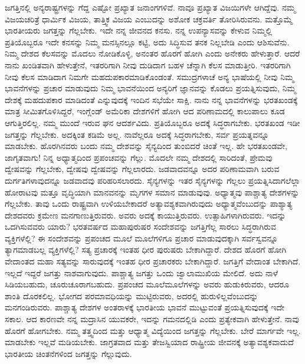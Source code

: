 \vskip   4pt

ಜಗತ್ತಿನಲ್ಲಿ ಅನ್ಯರಾಷ್ಟ್ರಗಳನ್ನು ಗೆದ್ದ ಎಷ್ಟೋ ಪ್ರಖ್ಯಾತ ಜನಾಂಗಗಳಿವೆ. ನಾವೂ ಪ್ರಖ್ಯಾತ ವಿಜಯಿಗಳೇ ಆಗಿದ್ದೆವು. ನಮ್ಮ ವಿಜಯಚರಿತ್ರೆ ಧಾರ್ಮಿಕ ವಿಜಯ, ತಾತ್ತ್ವಿಕ ವಿಜಯ ಎಂಬುದನ್ನು ಅಶೋಕ ಚಕ್ರವರ್ತಿ ತೋರಿಸಿರುವನು. ಮತ್ತೊಮ್ಮೆ ಭಾರತೀಯರು ಜಗತ್ತನ್ನು ಗೆಲ್ಲಬೇಕು. ಇದೇ ನನ್ನ ಜೀವನದ ಕನಸು. ನನ್ನ ಉಪನ್ಯಾಸವನ್ನು ಕೇಳುವ ನಿಮ್ಮಲ್ಲಿ ಪ್ರತಿಯೊಬ್ಬರೂ ಇದೇ ಕನಸನ್ನು ನಿಮ್ಮ ಮನಸ್ಸಿನಲ್ಲೂ ಕಟ್ಟಿ, ಅದು ಸಿದ್ಧಿಸುವ ತನಕ ನಿಲ್ಲಬೇಡಿ ಎಂದು ಆಶಿಸುವೆನು. ನಿಮ್ಮ ದೇಶದ ಕೆಲಸವನ್ನು ಮೊದಲು ನೋಡಿಕೊಳ್ಳಿ, ಅನಂತರ ಹೊರಗೆ ಹೋಗಿ ಎಂದು ಅನೇಕರು ಹೇಳುತ್ತಾರೆ. ಆದರೆ ನಾನು ಖಂಡಿತವಾಗಿ ಹೇಳುತ್ತೇನೆ, ಇತರರಿಗಾಗಿ ನೀವು ದುಡಿದಾಗ ಬಹಳ ಚೆನ್ನಾಗಿ ಕೆಲಸ ಮಾಡುತ್ತೀರಿ. ಇತರರಿಗಾಗಿ ನೀವು ಕೆಲಸ ಮಾಡಿದಾಗ ನಿಮಗೇ ಮಹದುಪಕಾರಮಾಡಿಕೊಂಡಂತೆ. ಸಮುದ್ರಗಳಾಚೆ ಅನ್ಯ ಭಾಷೆಯಲ್ಲಿ ನೀವು ನಿಮ್ಮ ಭಾವನೆಗಳನ್ನು ಪ್ರಚಾರ ಮಾಡುವುದು ನಿಮ್ಮ ಭಾವನೆಯಿಂದ ಅನ್ಯರಿಗೆ ಜ್ಞಾನವನ್ನು ಕೊಡಲು ಪ್ರಯತ್ನಿಸುವುದು, ನಿಮ್ಮ ದೇಶಕ್ಕೆ ಮಹದುಪಕಾರ ಮಾಡಿದಂತೆ ಎನ್ನುವುದಕ್ಕೆ ಇಂದಿನ ಸಭೆಯೇ ಸಾಕ್ಷಿ. ನಾನು ನನ್ನ ಭಾವನೆಗಳನ್ನು ಭರತಖಂಡಕ್ಕೆ ಮಾತ್ರ ಸೀಮಿತಗೊಳಿಸಿದ್ದರೆ, ಇಂಗ್ಲೆಂಡ್​ ಅಮೆರಿಕಾ ದೇಶಗಳಿಗೆ ಹೋಗಿ ಆದ ಪರಿಣಾಮದಲ್ಲಿ ಕಾಲುಪಾಲು ಕೂಡ ಆಗುತ್ತಿರಲಿಲ್ಲ. ನಮ್ಮ ಮುಂದೆ ಇರುವ ಘನ ಆದರ್ಶವಿದು. ಪ್ರತಿಯೊಬ್ಬರೂ ಅದಕ್ಕೆ ಸಿದ್ಧರಾಗಬೇಕು. ಭರತಖಂಡ ಇಡೀ ಜಗತ್ತನ್ನು ಗೆಲ್ಲಬೇಕು. ಅದಕ್ಕಿಂತ ಕಡಿಮೆ ಅಲ್ಲ. ನಾವೆಲ್ಲರೂ ಅದಕ್ಕೆ ಸಿದ್ಧರಾಗಬೇಕು, ಸರ್ವ ಪ್ರಯತ್ನವನ್ನೂ ಮಾಡಬೇಕು. ಹೊರಗಿನವರು ಬಂದು ನಮ್ಮ ದೇಶವನ್ನು ಸೈನ್ಯದಿಂದ ತುಂಬಿದರೆ\- ಚಿಂತೆ ಇಲ್ಲ. ಹೇ ಭರತಖಂಡವೇ, ಜಾಗೃತವಾಗು! ನಿನ್ನ ಅಧ್ಯಾತ್ಮದಿಂದ ಪ್ರಪಂಚವನ್ನು ಗೆಲ್ಲು. ಮೊದಲೇ ನಮ್ಮ ದೇಶದಲ್ಲಿ ಸಾರಿದಂತೆ, ಪ್ರೇಮವು ದ್ವೇಷವನ್ನು ಗೆಲ್ಲಬೇಕು, ದ್ವೇಷವು ದ್ವೇಷವನ್ನು ಗೆಲ್ಲಲಾರದು. ಜಡವಾದವನ್ನೂ ಅದರ ಪರಿಣಾಮವಾಗಿ ಬರುವ ದುರ್ಗತಿಗಳಾವುದನ್ನೂ ಜಡವಾದವು ಪರಿಹರಿಸಲಾರದು. ಸೈನ್ಯಗಳನ್ನು ಇತರ ಸೈನ್ಯಗಳನ್ನು ಗೆಲ್ಲಲು ಪ್ರಯತ್ನಿಸಿದಾಗಲೆಲ್ಲಾ ಹೋರಾಟವು ಮತ್ತೂ ವೃದ್ಧಿಯಾಗಿ ಮಾನವನನ್ನು ಮೃಗಗಳ ಸಮಾನ ಮಾಡುವುವು. ಅಧ್ಯಾತ್ಮವು ಪಾಶ್ಚಾತ್ಯ ದೇಶಗಳನ್ನು ಗೆಲ್ಲಬೇಕು. ತಾವು ಒಂದು ರಾಷ್ಟ್ರವಾಗಿ ಉಳಿಯಬೇಕಾದರೆ ಅತ್ಯಾವಶ್ಯಕವಾಗಿರುವುದು ಅಧ್ಯಾತ್ಮವೆಂಬುದನ್ನು ಪಾಶ್ಯಾತ್ಯ ದೇಶದವರು ಕ್ರಮೇಣ ಮನಗಾಣುತ್ತಿರುವರು. ಅವರು ಅದಕ್ಕೆ ಕಾಯುತ್ತಿರುವರು. ಉತ್ಸಾಹಿಗಳಾಗಿರುವರು. ಇದನ್ನು ಒದಗಿಸುವವರು ಯಾರು? ಭರತವರ್ಷದ ಮಹಾಪುರುಷರ ಸಂದೇಶವನ್ನು ಜಗತ್ತಿಗೆಲ್ಲ ಸಾರಲು ಸಿದ್ಧರಾಗಿರುವ ವ್ಯಕ್ತಿಗಳೆಲ್ಲಿ? ಈ ಸಂದೇಶವನ್ನು ಪ್ರಪಂಚದ ಮೂಲೆ ಮೂಲೆಗಳಿಗೂ ಪ್ರಚಾರ ಮಾಡುವುದಕ್ಕಾಗಿ ಸರ್ವಸ್ವವನ್ನೂ ತ್ಯಾಗಮಾಡಬಲ್ಲ ವ್ಯಕ್ತಿಗಳೆಲ್ಲಿ? ಸತ್ಯ ಪ್ರಚಾರಕ್ಕೆ ಇಂತಹ ಧೀರ ಪುರುಷರು ಬೇಕಾಗಿದ್ದಾರೆ. ದೇಶದ ಹೊರಗೆ ಹೋಗಿ ವೇದಾಂತದ ಮಹಾ ಸತ್ಯವನ್ನು ಸಾರುವುದಕ್ಕೆ ಇಂತಹ ಧೀರ ಪ್ರಚಾರಕರು ಬೇಕಾಗಿದ್ದಾರೆ. ಜಗತ್ತಿಗೆ ವೇದಾಂತ ಬೇಕಾಗಿದೆ. ಇಲ್ಲದೆ ಇದ್ದರೆ ಜಗತ್ತು ನಾಶವಾಗುವುದು. ಪಾಶ್ಚಾತ್ಯ ಜಗತ್ತು ಒಂದು ಜ್ವಾಲಾಮುಖಿಯ ಮೇಲಿದೆ. ಅದು ನಾಳೆ ಸಿಡಿಯಬಹುದು, ಚೂರುಚೂರಾಗಬಹುದು. ಪ್ರಪಂಚದ ಮೂಲೆಮೂಲೆಗಳನ್ನು ಅವರು ಹುಡುಕಿರುವರು, ಆದರೂ ಶಾಂತಿ ದೊರಕಲಿಲ್ಲ. ಭೋಗದ ಪರಮಾವಧಿಯನ್ನು ಮುಟ್ಟಿರುವರು, ಅದರಲ್ಲಿ ಹುರುಳಿಲ್ಲವೆಂಬುದನ್ನು ಮನಗಂಡಿರುವರು. ಪಾಶ್ಚಾತ್ಯ ದೇಶಗಳ ಅಂತರಾಳಕ್ಕೆ ಭಾರತೀಯ ಭಾವನೆ ಮುಟ್ಟುವಂತೆ ಪ್ರಯತ್ನಿಸುವುದಕ್ಕೆ ಇದೇ ಸಕಾಲ. ಆದ ಕಾರಣವೇ ನನ್ನ ಮದ್ರಾಸಿನ ಯುವಕರೇ, ಇದನ್ನು ಗಮನದಲ್ಲಿಡಿ ಎಂದು ಪ್ರತ್ಯೇಕವಾಗಿ ಹೇಳುತ್ತೇನೆ. ನಾವು ಹೊರಗೆ ಹೋಗಬೇಕು. ನಮ್ಮ ತತ್ತ್ವದಿಂದ ಮತ್ತು ಆಧ್ಯಾತ್ಮ ವಿದ್ಯೆಯಿಂದ ಜಗತ್ತನ್ನು ಗೆಲ್ಲಬೇಕು. ಬೇರೆ ಮಾರ್ಗವೇ ಇಲ್ಲ. ಮಾಡಬೇಕು ಇಲ್ಲವೆ ಮಡಿಯಬೇಕು. ಜಾಗ್ರತವಾದ ಮತ್ತು ತೇಜಸ್ವಿಯಾದ ರಾಷ್ಟ್ರೀಯ ಜೀವನಕ್ಕೆ ಅತ್ಯಾವಶ್ಯಕವಾದುದೆ ಭಾರತೀಯ ಚಿಂತನೆಗಳಿಂದ ಜಗತ್ತನ್ನು ಗೆಲ್ಲುವುದು.

